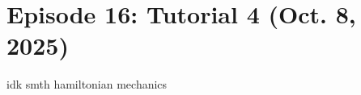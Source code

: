 \setcounter{section}{15}
\section{Episode 16: Tutorial 4 (Oct. 8, 2025)}
idk smth hamiltonian mechanics